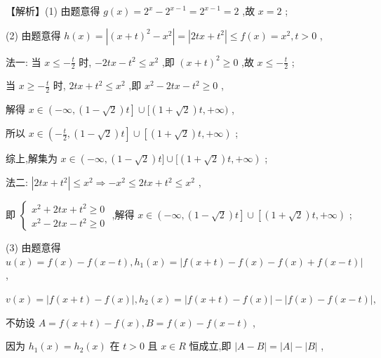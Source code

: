 \documentclass[10pt]{article}
\begin{document}
【解析】(1) 由题意得 \(g\left( x\right)  = {2}^{x} - {2}^{x - 1} = {2}^{x - 1} = 2\) ,故 \(x = 2\) ;

(2) 由题意得 \(h\left( x\right)  = \left| {{\left( x + t\right) }^{2} - {x}^{2}}\right|  = \left| {{2tx} + {t}^{2}}\right|  \leq  f\left( x\right)  = {x}^{2},t > 0\) ,

法一: 当 \(x \leq   - \frac{t}{2}\) 时, \(- {2tx} - {t}^{2} \leq  {x}^{2}\) ,即 \({\left( x + t\right) }^{2} \geq  0\) ,故 \(x \leq   - \frac{t}{2}\) ;

当 \(x \geq   - \frac{t}{2}\) 时, \({2tx} + {t}^{2} \leq  {x}^{2}\) ,即 \({x}^{2} - {2tx} - {t}^{2} \geq  0\) ,

解得 \(x \in  \left( {-\infty ,\left( {1 - \sqrt{2}}\right) t}\right\rbrack   \cup  \lbrack \left( {1 + \sqrt{2}}\right) t, + \infty )\) ,

所以 \(x \in  \left( {-\frac{t}{2},\left( {1 - \sqrt{2}}\right) t}\right\rbrack   \cup  \left\lbrack  {\left( {1 + \sqrt{2}}\right) t, + \infty }\right)\) ;

综上,解集为 \(x \in  \left( {-\infty ,\left( {1 - \sqrt{2}}\right) t\rbrack \cup \lbrack \left( {1 + \sqrt{2}}\right) t, + \infty }\right)\) ;

法二: \(\left| {{2tx} + {t}^{2}}\right|  \leq  {x}^{2} \Rightarrow   - {x}^{2} \leq  {2tx} + {t}^{2} \leq  {x}^{2}\) ,

即 \(\left\{  \begin{array}{l} {x}^{2} + {2tx} + {t}^{2} \geq  0 \\  {x}^{2} - {2tx} - {t}^{2} \geq  0 \end{array}\right.\) ,解得 \(x \in  \left( {-\infty ,\left( {1 - \sqrt{2}}\right) t}\right\rbrack   \cup  \left\lbrack  {\left( {1 + \sqrt{2}}\right) t, + \infty }\right)\) ;

(3) 由题意得 \(u\left( x\right)  = f\left( x\right)  - f\left( {x - t}\right) ,{h}_{1}\left( x\right)  = \left| {f\left( {x + t}\right)  - f\left( x\right)  - f\left( x\right)  + f\left( {x - t}\right) }\right|\) ,

\(v\left( x\right)  = \left| {f\left( {x + t}\right)  - f\left( x\right) }\right| ,{h}_{2}\left( x\right)  = \left| {f\left( {x + t}\right)  - f\left( x\right) }\right|  - \left| {f\left( x\right)  - f\left( {x - t}\right) }\right| ,\)

不妨设 \(A = f\left( {x + t}\right)  - f\left( x\right) ,B = f\left( x\right)  - f\left( {x - t}\right)\) ,

因为 \({h}_{1}\left( x\right)  = {h}_{2}\left( x\right)\) 在 \(t > 0\) 且 \(x \in  R\) 恒成立,即 \(\left| {A - B}\right|  = \left| A\right|  - \left| B\right|\) ,
\end{document}
